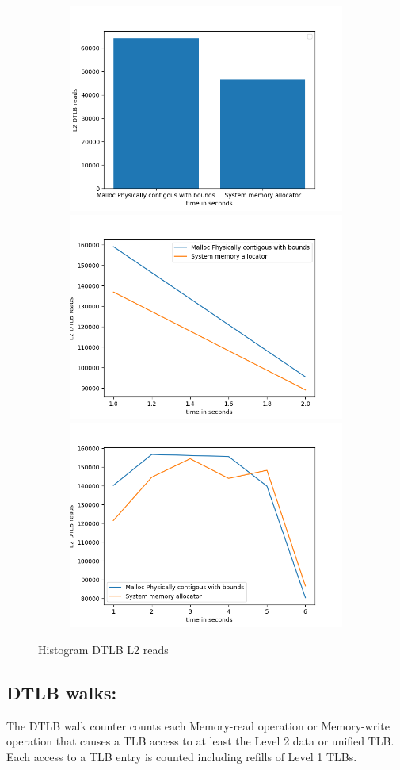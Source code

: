 \begin{figure}
  \begin{subfigure}{\linewidth}
    \includegraphics[width=.5\linewidth]{BenchmarkRuns/histogram/l2d_tlb_walk_histogram_small.png}\hfill
    \includegraphics[width=.5\linewidth]{BenchmarkRuns/histogram/tlb_l2_histogram_medium.png}\hfill
    \includegraphics[width=.5\linewidth]{BenchmarkRuns/histogram/tlb_l2_data_histogram_large.png}
  \caption{}
  \end{subfigure}
  \caption{Histogram DTLB L2 reads}
\end{figure}


\subsection{DTLB walks:}
The DTLB walk counter counts each Memory-read operation or Memory-write operation that causes a 
TLB access to at least the Level 2 data or unified TLB.
Each access to a TLB entry is counted including refills 
of Level 1 TLBs.

